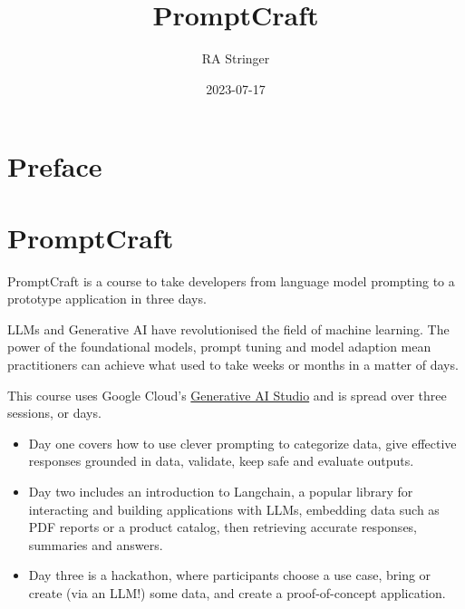 \documentclass[
  letterpaper,
  DIV=11,
  numbers=noendperiod]{scrreprt}
\title{PromptCraft}
\author{RA Stringer}
\date{2023-07-17}
\renewcommand*\contentsname{Table of contents}
\newcommand\contentsname{Table of contents}
\begin{document}
\maketitle
\ifdefined\Shaded\renewenvironment{Shaded}{\begin{tcolorbox}[breakable, sharp corners, borderline west={3pt}{0pt}{shadecolor}, interior hidden, frame hidden, enhanced, boxrule=0pt]}{\end{tcolorbox}}\fi

\renewcommand*\contentsname{Table of contents}
{
\hypersetup{linkcolor=}
\setcounter{tocdepth}{2}
\tableofcontents
}

\hypertarget{preface}{%
\chapter*{Preface}\label{preface}}



\hypertarget{promptcraft}{%
\chapter*{PromptCraft}\label{promptcraft}}


PromptCraft is a course to take developers from language model prompting
to a prototype application in three days.

LLMs and Generative AI have revolutionised the field of machine
learning. The power of the foundational models, prompt tuning and model
adaption mean practitioners can achieve what used to take weeks or
months in a matter of days.

This course uses Google Cloud's
\href{https://cloud.google.com/ai/generative-ai}{Generative AI Studio}
and is spread over three sessions, or days.

\begin{itemize}
\item
  Day one covers how to use clever prompting to categorize data, give
  effective responses grounded in data, validate, keep safe and evaluate
  outputs.
\item
  Day two includes an introduction to Langchain, a popular library for
  interacting and building applications with LLMs, embedding data such
  as PDF reports or a product catalog, then retrieving accurate
  responses, summaries and answers.
\item
  Day three is a hackathon, where participants choose a use case, bring
  or create (via an LLM!) some data, and create a proof-of-concept
  application.
\end{itemize}
\end{document}
